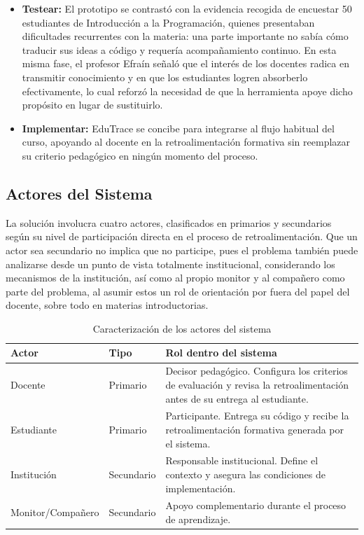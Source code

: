 \documentclass[letterpaper, 10 pt, conference]{ieeeconf}
\begin{document}
\begin{itemize}
	\item \textbf{Testear:} El prototipo se contrastó con la evidencia recogida de encuestar 50 estudiantes de Introducción a la Programación, quienes presentaban dificultades recurrentes con la materia: una parte importante no sabía cómo traducir sus ideas a código y requería acompañamiento continuo. En esta misma fase, el profesor Efraín señaló que el interés de los docentes radica en transmitir conocimiento y en que los estudiantes logren absorberlo efectivamente, lo cual reforzó la necesidad de que la herramienta apoye dicho propósito en lugar de sustituirlo.
	\item \textbf{Implementar:} EduTrace se concibe para integrarse al flujo habitual del curso, apoyando al docente en la retroalimentación formativa sin reemplazar su criterio pedagógico en ningún momento del proceso.
\end{itemize}

\subsection{Actores del Sistema}
La solución involucra cuatro actores, clasificados en primarios y secundarios según su nivel de participación directa en el proceso de retroalimentación. Que un actor sea secundario no implica que no participe, pues el problema también puede analizarse desde un punto de vista totalmente institucional, considerando los mecanismos de la institución, así como al propio monitor y al compañero como parte del problema, al asumir estos un rol de orientación por fuera del papel del docente, sobre todo en materias introductorias.

\begin{table}[ht]
	\centering
	\caption{Caracterización de los actores del sistema}
	\label{tab:actores}
	\begin{tabular}{llp{3.7cm}}
		\hline
		\textbf{Actor} & \textbf{Tipo} & \textbf{Rol dentro del sistema} \\
		\hline
		Docente & Primario & Decisor pedagógico. Configura los criterios de evaluación y revisa la retroalimentación antes de su entrega al estudiante. \\
		Estudiante & Primario & Participante. Entrega su código y recibe la retroalimentación formativa generada por el sistema. \\
		Institución & Secundario & Responsable institucional. Define el contexto y asegura las condiciones de implementación. \\
		Monitor/Compañero & Secundario & Apoyo complementario durante el proceso de aprendizaje. \\
		\hline
	\end{tabular}
\end{table}
\end{document}
